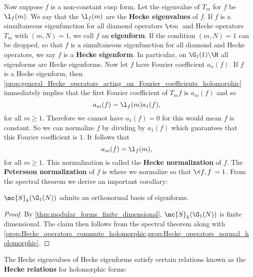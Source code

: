     Now suppose $f$ is a non-constant cusp form. Let the eigenvalue of $T_{m}$ for $f$ be $\l_{f}(m)$. We say that the $\l_{f}(m)$ are the \textbf{Hecke eigenvalues} of $f$. If $f$ is a simultaneous eigenfunction for all diamond operators $\<m\>$ and Hecke operators $T_{m}$ with $(m,N) = 1$, we call $f$ an \textbf{eigenform}. If the condition $(m,N) = 1$ can be dropped, so that $f$ is a simultaneous eigenfunction for all diamond and Hecke operators, we say $f$ is a \textbf{Hecke eigenform}. In particular, on $\G_{1}(1)\backslash\H$ all eigenforms are Hecke eigenforms. Now let $f$ have Fourier coefficient $a_{n}(f)$. If $f$ is a Hecke eigenform, then \cref{prop:general_Hecke_operators_acting_on_Fourier_coefficients_holomorphic} immediately implies that the first Fourier coefficient of $T_{m}f$ is $a_{m}(f)$ and so
    \[
      a_{m}(f) = \l_{f}(m)a_{1}(f),
    \]
    for all $m \ge 1$. Therefore we cannot have $a_{1}(f) = 0$ for this would mean $f$ is constant. So we can normalize $f$ by dividing by $a_{1}(f)$ which guarantees that this Fourier coefficient is $1$. It follows that
    \[
      a_{m}(f) = \l_{f}(m),
    \]
    for all $m \ge 1$. This normalization is called the \textbf{Hecke normalization} of $f$. The \textbf{Petersson normalization} of $f$ is where we normalize so that $\<f,f\> = 1$. From the spectral theorem we derive an important corollary:

    \begin{theorem}\label{thm:eigenforms_forms_spectral_theory_holomorphic}
      $\mc{S}_{k}(\G_{1}(N))$ admits an orthonormal basis of eigenforms.
    \end{theorem}
    \begin{proof}
      By \cref{thm:modular_forms_finite_dimensional}, $\mc{S}_{k}(\G_{1}(N))$ is finite dimensional. The claim then follows from the spectral theorem along with \cref{prop:Hecke_operators_commute_holomorphic,prop:Hecke_operators_normal_holomorphic}.
    \end{proof}

    The Hecke eigenvalues of Hecke eigenforms satisfy certain relations known as the \textbf{Hecke relations} for holomorphic forms:


